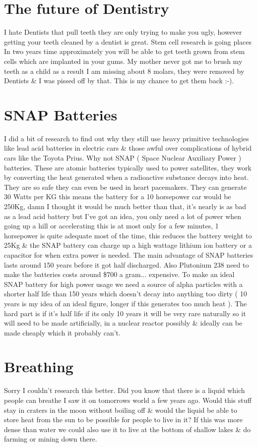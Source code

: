 \documentclass[a4paper,12pt,titlepage]{book}
\begin{document}
\section{The future of Dentistry}
I hate Dentists that pull teeth they are only
trying to make you ugly, however getting your
teeth cleaned by a dentist is great.
Stem cell research is going places
In two years time approximately you will be able
to get teeth grown from stem cells which
are implanted in your gums.
My mother never got me to brush my teeth as a
child as a result I am missing about 8 molars,
they were removed by Dentists \& I was pissed off by that.
This is my chance to get them back :-).

\section{SNAP Batteries}
I did a bit of research to find out why they still use
heavy primitive technologies like lead acid batteries 
in electric cars \& those awful over complications of 
hybrid cars like the Toyota Prius. Why not SNAP
( Space Nuclear Auxiliary Power ) batteries.
These are atomic batteries typically used to power satellites,
they work by converting the heat generated when a radioactive
substance decays into heat.
They are so safe they can even be used in heart pacemakers.
They can generate 30 Watts per KG this means the battery
for a 10 horsepower car would be 250Kg,  damn I thought
it would be much better than that, it's nearly
is as bad as a lead acid battery but I've got an idea,
you only need a lot of power when going up a hill
or accelerating this is at most only for a few minutes,
1 horsepower is quite adequate most of the time,
this reduces the battery weight to 25Kg \&
the SNAP battery can charge up a high wattage lithium
ion battery or a capacitor for when extra power is needed.
The main advantage of SNAP batteries lasts 
around 150 years before it got half discharged.
Also Plutonium 238 need to make the batteries 
costs around \$700 a gram... expensive.
To make an ideal SNAP battery for high power usage
we need a source of alpha particles with a shorter 
half life than 150 years which doesn't decay into
anything too dirty  ( 10 years is my idea of an ideal
figure, longer if this generates too much heat ).
The hard part is if it's half
life if its only 10 years it will be very rare naturally so
it will need to be made artificially, in a nuclear reactor possibly
\& ideally can be made cheaply which it probably can't.

\section{Breathing}
Sorry I couldn't research this better.
Did you know that there is a liquid which
people can breathe I saw it on tomorrows world a few years ago.
Would this stuff stay in craters in the moon without boiling off
\& would the liquid be able to store heat from the sun
to be possible for people to live in it?
If this was more dense than water we could also use it
to live at the bottom of shallow lakes \& do
farming or mining down there.
\end{document}
